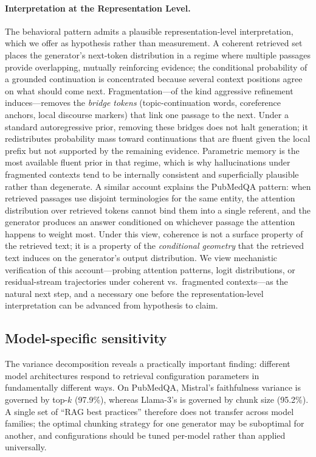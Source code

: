 \paragraph{Interpretation at the Representation Level.}
The behavioral pattern admits a plausible representation-level
interpretation, which we offer as hypothesis rather than measurement. A
coherent retrieved set places the generator's next-token distribution in
a regime where multiple passages provide overlapping, mutually reinforcing
evidence; the conditional probability of a grounded continuation is
concentrated because several context positions agree on what should come
next. Fragmentation---of the kind aggressive refinement induces---removes
the \emph{bridge tokens} (topic-continuation words, coreference anchors,
local discourse markers) that link one passage to the next. Under a
standard autoregressive prior, removing these bridges does not halt
generation; it redistributes probability mass toward continuations that
are fluent given the local prefix but not supported by the remaining
evidence. Parametric memory is the most available fluent prior in that
regime, which is why hallucinations under fragmented contexts tend to be
internally consistent and superficially plausible rather than degenerate.
A similar account explains the PubMedQA pattern: when retrieved passages
use disjoint terminologies for the same entity, the attention distribution
over retrieved tokens cannot bind them into a single referent, and the
generator produces an answer conditioned on whichever passage the
attention happens to weight most. Under this view, coherence is not a
surface property of the retrieved text; it is a property of the
\emph{conditional geometry} that the retrieved text induces on the
generator's output distribution. We view mechanistic verification of this
account---probing attention patterns, logit distributions, or
residual-stream trajectories under coherent vs.\ fragmented contexts---as
the natural next step, and a necessary one before the representation-level
interpretation can be advanced from hypothesis to claim.

\subsection{Model-specific sensitivity}

The variance decomposition reveals a practically important finding:
different model architectures respond to retrieval configuration
parameters in fundamentally different ways. On PubMedQA, Mistral's
faithfulness variance is governed by top-$k$ (97.9\%), whereas
Llama-3's is governed by chunk size (95.2\%). A single set of ``RAG
best practices'' therefore does not transfer across model families; the
optimal chunking strategy for one generator may be suboptimal for
another, and configurations should be tuned per-model rather than
applied universally.

